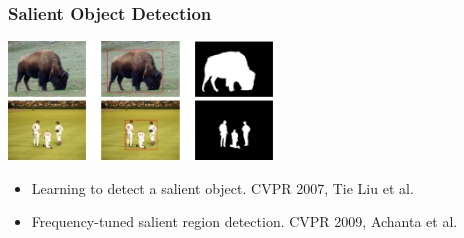 \documentclass[notheorems,serif,table,compress]{beamer}  %
\begin{document}
\begin{frame}
\frametitle{Salient Object Detection}
\centering\includegraphics[width=7cm]{FT.png}
\begin{itemize}
\item Learning to detect a salient object. CVPR 2007, Tie Liu et al.
\item Frequency-tuned salient region detection. CVPR 2009, Achanta et al.
\end{itemize}
\end{frame}


%
%
\end{document}
